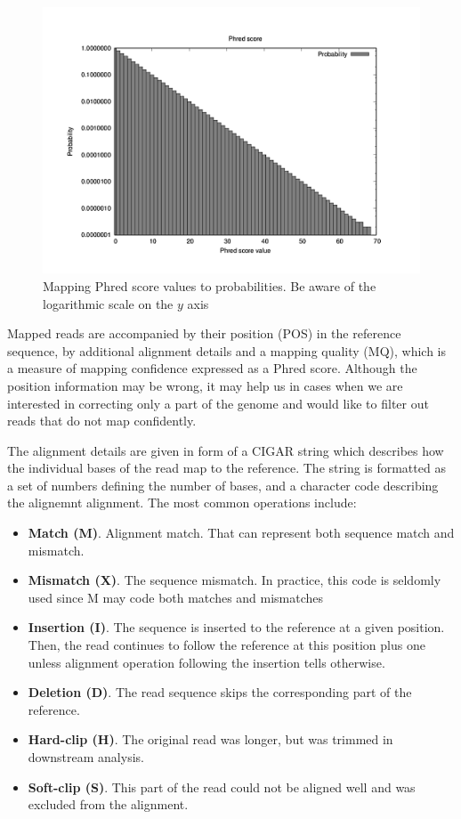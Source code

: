 \begin{figure}[h]
	\centering
	\includegraphics{img/quality-score.pdf}
	\caption{Mapping Phred score values to probabilities. Be aware of the logarithmic scale on the $y$ axis}
	\label{fig:quality-score}
\end{figure}


Mapped reads are accompanied by their position (POS) in the reference sequence, by additional alignment details and a mapping quality (MQ), which is a measure of mapping confidence expressed as a Phred score. Although the position information may be wrong, it may help us in cases when we are interested in correcting only a part of the genome and would like to filter out reads that do not map confidently.

The alignment details are given in form of a CIGAR string which describes how the individual bases of the read map to the reference. The string is formatted as a set of numbers defining the number of bases, and a character code describing the alignemnt alignment. The most common operations include:
\begin{itemize}
\item \textbf{Match (M)}. Alignment match. That can represent both sequence match and mismatch.
\item \textbf{Mismatch (X)}. The sequence mismatch. In practice, this code is seldomly used since M may code both matches and mismatches
\item \textbf{Insertion (I)}. The sequence is inserted to the reference at a given position. Then, the read continues to follow the reference at this position plus one unless alignment operation following the insertion tells otherwise.
\item \textbf{Deletion (D)}. The read sequence skips the corresponding part of the reference.
\item \textbf{Hard-clip (H)}. The original read was longer, but was trimmed in downstream analysis.
\item \textbf{Soft-clip (S)}. This part of the read could not be aligned well and was excluded from the alignment.
\end{itemize}

